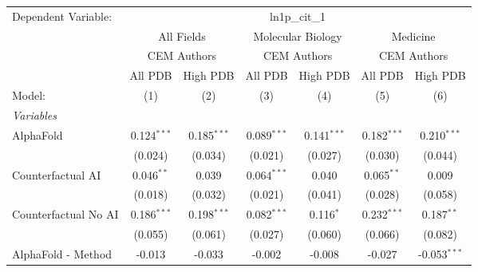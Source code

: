 \begingroup
\centering
\begin{tabular}{lcccccc}
   \tabularnewline \midrule \midrule
   Dependent Variable: & \multicolumn{6}{c}{ln1p\_cit\_1}\\
 & \multicolumn{2}{c}{All Fields} & \multicolumn{2}{c}{Molecular Biology} & \multicolumn{2}{c}{Medicine} \\
\cmidrule(lr){2-3} \cmidrule(lr){4-5} \cmidrule(lr){6-7}
 & \multicolumn{2}{c}{CEM Authors} & \multicolumn{2}{c}{CEM Authors} & \multicolumn{2}{c}{CEM Authors} \\
\cmidrule(lr){2-3} \cmidrule(lr){4-5} \cmidrule(lr){6-7}
 & \multicolumn{1}{c}{All PDB} & \multicolumn{1}{c}{High PDB} & \multicolumn{1}{c}{All PDB} & \multicolumn{1}{c}{High PDB} & \multicolumn{1}{c}{All PDB} & \multicolumn{1}{c}{High PDB} \\
\cmidrule(lr){2-2} \cmidrule(lr){3-3} \cmidrule(lr){4-4} \cmidrule(lr){5-5} \cmidrule(lr){6-6} \cmidrule(lr){7-7}
   Model:                                                     & (1)           & (2)           & (3)           & (4)           & (5)           & (6)\\  
   \midrule
   \emph{Variables}\\
   AlphaFold                                                  & 0.124$^{***}$ & 0.185$^{***}$ & 0.089$^{***}$ & 0.141$^{***}$ & 0.182$^{***}$ & 0.210$^{***}$\\   
                                                              & (0.024)       & (0.034)       & (0.021)       & (0.027)       & (0.030)       & (0.044)\\   
   Counterfactual AI                                          & 0.046$^{**}$  & 0.039         & 0.064$^{***}$ & 0.040         & 0.065$^{**}$  & 0.009\\   
                                                              & (0.018)       & (0.032)       & (0.021)       & (0.041)       & (0.028)       & (0.058)\\   
   Counterfactual No AI                                       & 0.186$^{***}$ & 0.198$^{***}$ & 0.082$^{***}$ & 0.116$^{*}$   & 0.232$^{***}$ & 0.187$^{**}$\\   
                                                              & (0.055)       & (0.061)       & (0.027)       & (0.060)       & (0.066)       & (0.082)\\   
   AlphaFold - Method                                         & -0.013        & -0.033        & -0.002        & -0.008        & -0.027        & -0.053$^{***}$\\   

\end{tabular}
